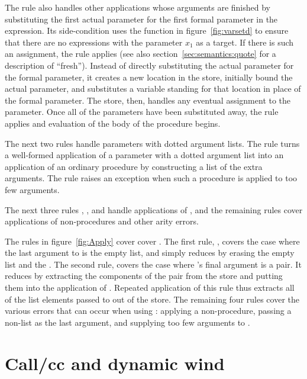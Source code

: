 The  rule also handles other applications whose
arguments are finished by substituting the first actual parameter for
the first formal parameter in the expression. Its side-condition uses
the function in figure~\ref{fig:varsetd} to ensure that there are no
 expressions with the parameter $x_1$ as a target.
If there is such an assignment, the  rule applies (see also section~\ref{sec:semantics:quote} for a description of ``fresh'').
Instead of directly substituting the actual parameter for the formal
parameter, it creates a new location in the store, initially bound the
actual parameter, and substitutes a variable standing for that
location in place of the formal parameter. The store, then, handles
any eventual assignment to the parameter. Once all of the parameters
have been substituted away, the rule  applies and
evaluation of the body of the procedure begins.

The next two rules handle parameters with dotted argument lists. The
rule  turns a well-formed application of a
parameter with a dotted argument list into an application of an
ordinary procedure by constructing a list of the extra arguments. The
 rule raises an exception when such a procedure
is applied to too few arguments.

The next three rules , , and
 handle applications of , and the
remaining rules cover applications of non-procedures and other arity
errors.

The rules in figure~\ref{fig:Apply} cover 
cover . The first
rule, , covers the case where the last argument to
 is the empty list, and simply reduces by erasing the
empty list and the . The second rule, 
covers the case where 's final argument is a pair. It
reduces by extracting the components of the pair from the store and
putting them into the application of . Repeated
application of this rule thus extracts all of the list elements passed
to  out of the store. The remaining four rules cover the
various errors that can occur when using : applying a
non-procedure, passing a non-list as the last argument, and supplying
too few arguments to .

\section{Call/cc and dynamic wind}

